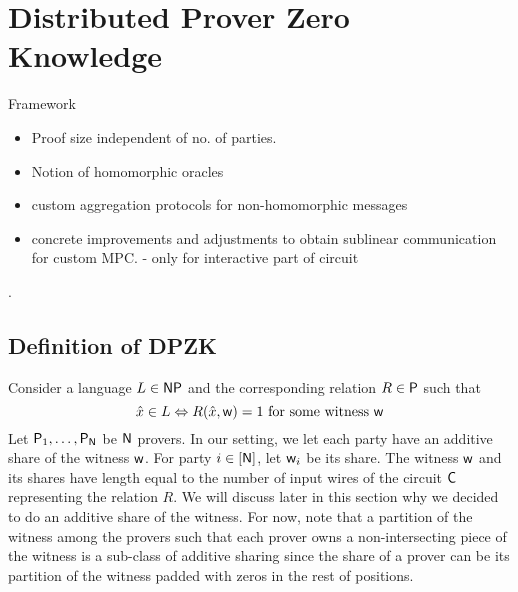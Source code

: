 \section{Distributed Prover Zero Knowledge}
Framework
\begin{itemize}
\item Proof size independent of no. of parties.
\item Notion of homomorphic oracles
\item custom aggregation protocols for non-homomorphic messages
\item concrete improvements and adjustments to obtain sublinear communication for custom MPC. - only for interactive part of circuit
\end{itemize}
. 
\subsection{Definition of DPZK}
Consider a language $L \in \mathsf{NP}$ and the corresponding relation $R \in \mathsf{P}$ such that
\[
\hat{x} \in L \Leftrightarrow R(\hat{x}, \mathsf{w})=1 \text{ for some witness } \mathsf{w}
\]
Let $\mathsf{P}_1, \ldots, \mathsf{P}_{\mathsf{N}}$ be $\mathsf{N}$ provers. In our setting, we let each party have an additive share of the witness $\mathsf{w}$. For party $i \in [\mathsf{N}]$, let $\mathsf{w}_i$ be its share.  The witness $\mathsf{w}$ and its shares have length equal to the number of input wires of the circuit $\mathsf{C}$ representing the relation $R$. We will discuss later in this section why we decided to do an additive share of the witness. For now, note that a partition of the witness among the provers such that each prover owns a non-intersecting piece of the witness is a sub-class of additive sharing since the share of a prover can be its partition of the witness padded with zeros in the rest of positions.


